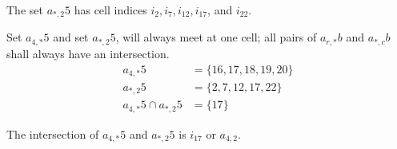 \documentclass[letterpaper, twoside,12pt]{book}
\begin{document}
    The set $a_{*,2}5$ has cell indices $i_{2}, i_{7}, i_{12}, i_{17}$, and $i_{22}$.

    Set $a_{4,*}5$ and set $a_{*,2}5$, will always meet at one cell; all pairs of $a_{r,*}b$ and $a_{*,c}b$ shall always have an intersection.
    \begin{equation*}
        \begin{split}
            a_{4,*}5 &= \{16, 17, 18, 19, 20 \} \\
            a_{*,2}5 &= \{2, 7, 12, 17, 22 \} \\
            a_{4,*}5 \cap a_{*,2}5 &= \{17\}
        \end{split}
    \end{equation*}

    The intersection of $a_{4,*}5$ and $a_{*,2}5$ is $i_{17}$ or $a_{4,2}$.
\end{document}
